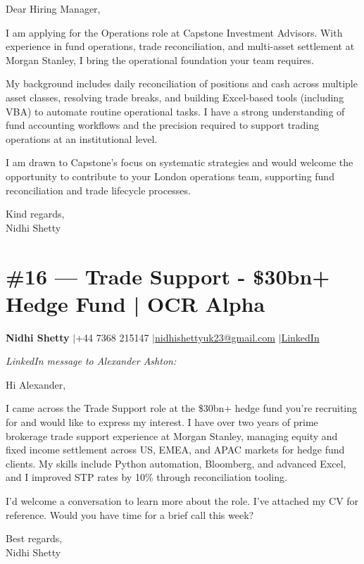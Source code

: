 \documentclass[11pt,a4paper]{article}
\makeatletter
\newcommand{\coverheader}{%
\begin{flushleft}
{\bfseries Nidhi Shetty} \enspace$\vert$\enspace +44 7368 215147 \enspace$\vert$\enspace \href{mailto:nidhishettyuk23@gmail.com}{nidhishettyuk23@gmail.com} \enspace$\vert$\enspace \href{https://www.linkedin.com/in/nidhi-shetty23-1841b7181}{LinkedIn}
\end{flushleft}
\vspace{4pt}
}
\makeatother
\begin{document}
Dear Hiring Manager,

I am applying for the Operations role at Capstone Investment Advisors. With experience in fund operations, trade reconciliation, and multi-asset settlement at Morgan Stanley, I bring the operational foundation your team requires.

My background includes daily reconciliation of positions and cash across multiple asset classes, resolving trade breaks, and building Excel-based tools (including VBA) to automate routine operational tasks. I have a strong understanding of fund accounting workflows and the precision required to support trading operations at an institutional level.

I am drawn to Capstone's focus on systematic strategies and would welcome the opportunity to contribute to your London operations team, supporting fund reconciliation and trade lifecycle processes.

\vspace{8pt}
Kind regards,\\
Nidhi Shetty

\newpage
\section{\#16 --- Trade Support - \$30bn+ Hedge Fund | OCR Alpha}
\coverheader

\textit{LinkedIn message to Alexander Ashton:}

\vspace{6pt}

Hi Alexander,

I came across the Trade Support role at the \$30bn+ hedge fund you're recruiting for and would like to express my interest. I have over two years of prime brokerage trade support experience at Morgan Stanley, managing equity and fixed income settlement across US, EMEA, and APAC markets for hedge fund clients. My skills include Python automation, Bloomberg, and advanced Excel, and I improved STP rates by 10\% through reconciliation tooling.

I'd welcome a conversation to learn more about the role. I've attached my CV for reference. Would you have time for a brief call this week?

\vspace{8pt}
Best regards,\\
Nidhi Shetty

\newpage
\end{document}
